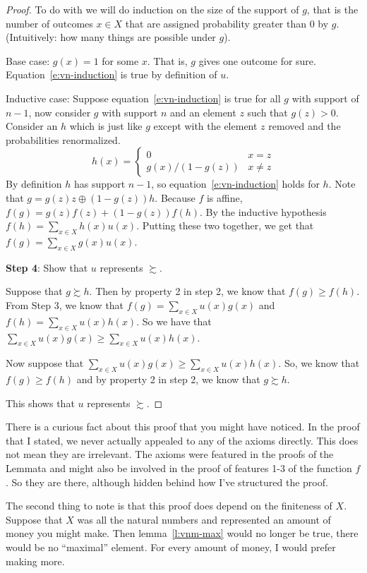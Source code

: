 \begin{proof}
To do with we will do induction on the size of the support of $g$, that is the number of outcomes $x \in X$ that are assigned probability greater than $0$ by $g$.  (Intuitively: how many things are possible under $g$).

Base case: $g(x) = 1$ for some $x$.  That is, $g$ gives one outcome for sure. Equation~\ref{e:vn-induction} is true by definition of $u$.

Inductive case: Suppose equation~\ref{e:vn-induction} is true for all $g$ with support of $n-1$, now consider $g$ with support $n$ and an element $z$ such that $g(z) > 0$. Consider an $h$ which is just like $g$ except with the element $z$ removed and the probabilities renormalized.
\[
            h(x) = \begin{cases}
            0 & x = z \\
            g(x)/(1-g(z)) & x \ne z
            \end{cases}
\]
By definition $h$ has support $n-1$, so equation~\ref{e:vn-induction} holds for $h$.  Note that $g = g(z) z \oplus (1-g(z))h$. Because $f$ is affine, $f(g) = g(z) f(z) + (1-g(z))f(h)$. By the inductive hypothesis $f(h) = \sum_{x \in X} h(x) u(x)$. Putting these two together, we get that $f(g) = \sum_{x \in X} g(x) u(x) $.

{\bf Step 4}: Show that $u$ represents $\succsim$.  

Suppose that $g \succsim h$.  Then by property 2 in step 2, we know that $f(g) \geq f(h)$.  From Step 3, we know that $f(g) = \sum_{x \in X} u(x)g(x)$ and $f(h) = \sum_{x \in X} u(x)h(x)$. So we have that $\sum_{x \in X} u(x)g(x) \geq \sum_{x \in X} u(x)h(x)$.  

Now suppose that $\sum_{x \in X} u(x)g(x) \geq \sum_{x \in X} u(x)h(x)$.  So, we know that $f(g) \geq f(h)$ and by property 2 in step 2, we know that $g \succsim h$. 

This shows that $u$ represents $\succsim$.
\end{proof}

There is a curious fact about this proof that you might have noticed.  In the proof that I stated, we never actually appealed to any of the axioms directly.  This does not mean they are irrelevant. The axioms were featured in the proofs of the Lemmata and might also be involved in the proof of features 1-3 of the function $f$.  So they are there, although hidden behind how I've structured the proof.

The second thing to note is that this proof does depend on the finiteness of $X$. Suppose that $X$ was all the natural numbers and represented an amount of money you might make.  Then lemma~\ref{l:vnm-max} would no longer be true, there would be no ``maximal'' element.  For every amount of money, I would prefer making more.  

